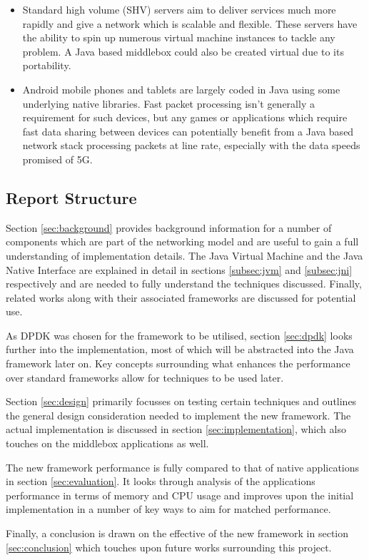 \documentclass[final_report.tex]{subfiles}
\begin{document}
\begin{itemize}
	\item Standard high volume (SHV) servers aim to deliver services much more rapidly and give a network which is scalable and flexible. These servers have the ability to spin up numerous virtual machine instances to tackle any problem. A Java based middlebox could also be created virtual due to its portability.
	\item Android mobile phones and tablets are largely coded in Java using some underlying native libraries. Fast packet processing isn't generally a requirement for such devices, but any games or applications which require fast data sharing between devices can potentially benefit from a Java based network stack processing packets at line rate, especially with the data speeds promised of 5G.
\end{itemize}

\newpage

\subsection{Report Structure}
Section \ref{sec:background} provides background information for a number of components which are part of the networking model and are useful to gain a full understanding of implementation details. The Java Virtual Machine and the Java Native Interface are explained in detail in sections \ref{subsec:jvm} and \ref{subsec:jni} respectively and are needed to fully understand the techniques discussed. Finally, related works along with their associated frameworks are discussed for potential use.

As DPDK was chosen for the framework to be utilised, section \ref{sec:dpdk} looks further into the implementation, most of which will be abstracted into the Java framework later on. Key concepts surrounding what enhances the performance over standard frameworks allow for techniques to be used later.

Section \ref{sec:design} primarily focusses on testing certain techniques and outlines the general design consideration needed to implement the new framework. The actual implementation is discussed in section \ref{sec:implementation}, which also touches on the middlebox applications as well.

The new framework performance is fully compared to that of native applications in section \ref{sec:evaluation}. It looks through analysis of the applications performance in terms of memory and CPU usage and improves upon the initial implementation in a number of key ways to aim for matched performance.

Finally, a conclusion is drawn on the effective of the new framework in section \ref{sec:conclusion} which touches upon future works surrounding this project.
\end{document}
